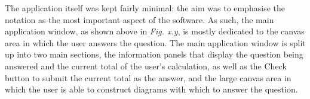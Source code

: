 \documentclass[12pt,twoside,notitlepage,xetex]{report}
\begin{document}
The application itself was kept fairly minimal: the aim was to emphasise the
notation as the most important aspect of the software.  As such, the main
application window, as shown above in \emph{Fig. x.y}, is mostly dedicated to
the canvas area in which the user answers the question.  The main application
window is split up into two main sections, the information panels that display the question being answered and the current
total of the user's calculation, as well as the {\sfapp Check} button to submit
the current total as the answer, and the large canvas
area in which the user is able to construct diagrams with which to answer the
question.

\end{document}
